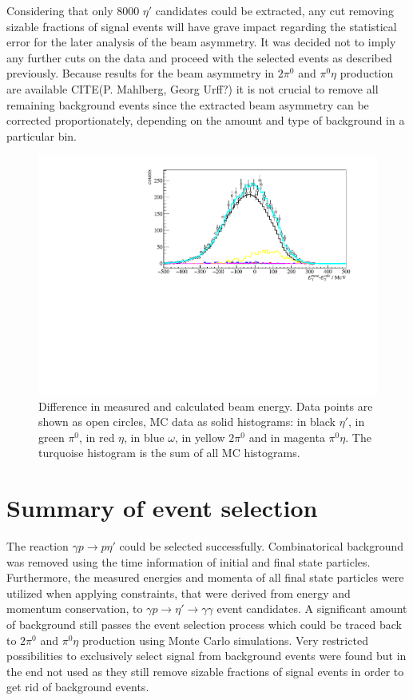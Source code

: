 Considering that only 8000 $\eta'$ candidates could be extracted, any cut removing sizable fractions of signal events will have grave impact regarding the statistical error for the later analysis of the beam asymmetry. It was decided not to imply any further cuts on the data and proceed with the selected events as described previously. Because results for the beam asymmetry in $2\pi^0$ and $\pi^0\eta$ production are available {\color{red} CITE(P. Mahlberg, Georg Urff?)} it is not crucial to remove all remaining background events since the extracted beam asymmetry can be corrected proportionately, depending on the amount and type of background in a particular bin. 
\begin{figure}[htbp]
	\centering
	\includegraphics[width=\linewidth]{../figs/hydrogen/calc_beam.pdf}
	\caption{Difference in measured and calculated beam energy. Data points are shown as open circles, MC data as solid histograms: in black $\eta'$, in green $\pi^0$, in red $\eta$, in blue $\omega$, in yellow $2\pi^0$ and in magenta $\pi^0\eta$. The turquoise histogram is the sum of all MC histograms.}
	\label{fig:beame}
\end{figure}

\section{Summary of event selection}
The reaction $\gamma p\to p\eta'$ could be selected successfully. Combinatorical background was removed using the time information of initial and final state particles. Furthermore, the measured energies and momenta of all final state particles were utilized when applying constraints, that were derived from energy and momentum conservation, to $\gamma p\to\eta'\to\gamma\gamma$ event candidates. A significant amount of background still passes the event selection process which could be traced back to $2\pi^0$ and $\pi^0\eta$ production using Monte Carlo simulations. Very restricted possibilities to exclusively select signal from background events were found but in the end not used as they still remove sizable fractions of signal events in order to get rid of background events.

